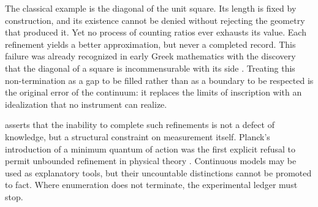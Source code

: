 The classical example is the diagonal of the unit square. Its length is fixed by
construction, and its existence cannot be denied without rejecting the geometry
that produced it. Yet no process of counting ratios ever exhausts its value. Each
refinement yields a better approximation, but never a completed record. This
failure was already recognized in early Greek mathematics with the discovery
that the diagonal of a square is incommensurable with its side
\cite{euclid300bc}. Treating this non-termination as a gap to be filled rather
than as a boundary to be respected is the original error of the continuum: it
replaces the limits of inscription with an idealization that no instrument can
realize.

 asserts that the inability
to complete such refinements is not a defect of knowledge, but a structural
constraint on measurement itself. Planck's introduction of a minimum quantum of
action was the first explicit refusal to permit unbounded refinement in physical
theory \cite{planck1900}. Continuous models may be used as explanatory tools,
but their uncountable distinctions cannot be promoted to fact. Where enumeration
does not terminate, the experimental ledger must stop.


